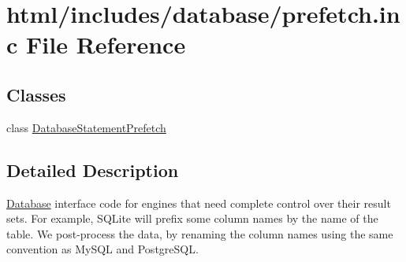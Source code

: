 \hypertarget{prefetch_8inc}{
\section{html/includes/database/prefetch.inc File Reference}
\label{prefetch_8inc}
}
\subsection*{Classes}
\begin{DoxyCompactItemize}
\item 
class \hyperlink{classDatabaseStatementPrefetch}{DatabaseStatementPrefetch}
\end{DoxyCompactItemize}


\subsection{Detailed Description}
\hyperlink{classDatabase}{Database} interface code for engines that need complete control over their result sets. For example, SQLite will prefix some column names by the name of the table. We post-\/process the data, by renaming the column names using the same convention as MySQL and PostgreSQL. 